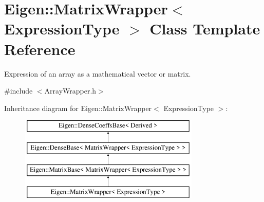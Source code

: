 \hypertarget{class_eigen_1_1_matrix_wrapper}{}\section{Eigen\+::Matrix\+Wrapper$<$ Expression\+Type $>$ Class Template Reference}
\label{class_eigen_1_1_matrix_wrapper}


Expression of an array as a mathematical vector or matrix.  




{\ttfamily \#include $<$Array\+Wrapper.\+h$>$}

Inheritance diagram for Eigen\+::Matrix\+Wrapper$<$ Expression\+Type $>$\+:\begin{figure}[H]
\begin{center}
\leavevmode
\includegraphics[height=4.000000cm]{class_eigen_1_1_matrix_wrapper}
\end{center}
\end{figure}
